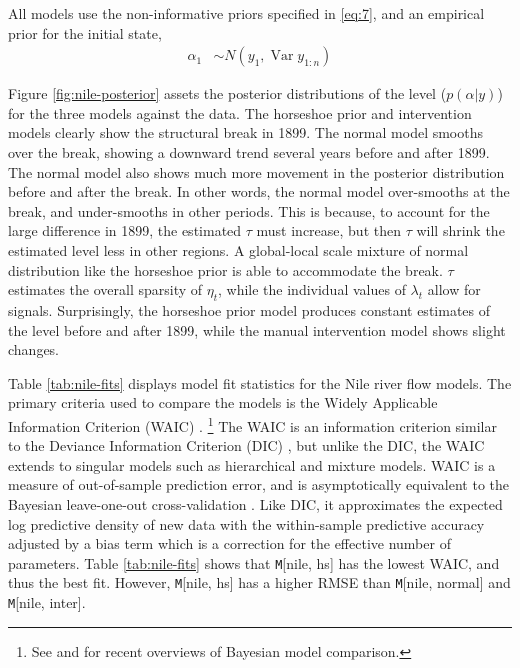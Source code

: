 \documentclass{article}
\DeclareMathOperator{\Var}{Var}
\newcommand{\Model}[2]{\texttt{M}[#1, #2]}
\begin{document}
All models use the non-informative priors specified in \eqref{eq:7}, and an empirical prior for the initial state,
\begin{align}
  \label{eq:13}
  \alpha_{1} &\sim N(y_{1}, \Var y_{1:n})
\end{align}

Figure \ref{fig:nile-posterior} assets the posterior distributions of the level ($p(\alpha | y)$) for the three models against the data.
The horseshoe prior and intervention models clearly show the structural break in 1899. 
The normal model smooths over the break, showing a downward trend several years before and after 1899. 
The normal model also shows much more movement in the posterior distribution before and after the break.
In other words, the normal model over-smooths at the break, and under-smooths in other periods.
This is because, to account for the large difference in 1899, the estimated $\tau$ must increase, but then $\tau$ will shrink the estimated level less in other regions.
A global-local scale mixture of normal distribution like the horseshoe prior is able to accommodate the break.
$\tau$ estimates the overall sparsity of $\eta_{t}$, while the individual values of $\lambda_{t}$ allow for signals.
Surprisingly, the horseshoe prior model produces constant estimates of the level before and after 1899, while the manual intervention model shows slight changes.

Table \ref{tab:nile-fits} displays model fit statistics for the Nile river flow models.
The primary criteria used to compare the models is the Widely Applicable Information Criterion (WAIC) \parencite{Watanabe2010}.%
\footnote{See \textcite{GelmanHwangVehtari2013} and \textcite{VehtariOjanen2012} for recent overviews of Bayesian model comparison.}
The WAIC is an information criterion similar to the Deviance Information Criterion (DIC) \parencite{spiegelhalter2002bayes}, but unlike the DIC, the WAIC extends to singular models such as hierarchical and mixture models.
WAIC is a measure of out-of-sample prediction error, and is asymptotically equivalent to the Bayesian leave-one-out cross-validation \parencite{Watanabe2010}.
Like DIC, it approximates the expected log predictive density of new data with the within-sample predictive accuracy adjusted by a bias term which is a correction for the effective number of parameters.
Table \ref{tab:nile-fits} shows that \Model{nile}{hs} has the lowest WAIC, and thus the best fit.
However, \Model{nile}{hs} has a higher RMSE than \Model{nile}{normal} and \Model{nile}{inter}.
\end{document}
